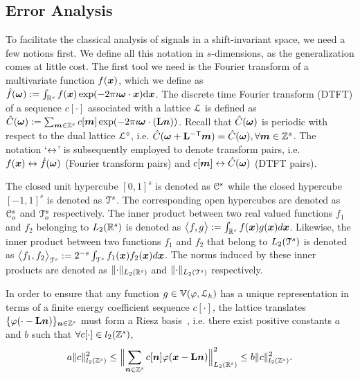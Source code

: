 \subsection{Error Analysis} \label{sec:sis_error}
To facilitate the classical analysis of signals in a shift-invariant space, we need a few notions first. We define all this notation in $s$-dimensions, as the generalization comes at little cost. The first tool we need is the Fourier transform of a multivariate function $f(\boldsymbol{x})$, which we define as $ \hat{f}(\boldsymbol{\omega}) := \int_{\mathbb{R}^s} f(\boldsymbol{x}) \exp(-2\pi \imath \boldsymbol{\omega} \cdot \boldsymbol{x}) \mathrm{d}\boldsymbol{x} $. The discrete time Fourier transform (DTFT) of a sequence $c[\cdot]$ associated with a lattice $\mathcal{L}$ is defined as $\hat{C}(\boldsymbol{\omega}) := \sum_{\boldsymbol{m}  \in \mathbb{Z}^s} c[\boldsymbol{m}] \exp(-2 \pi \imath \boldsymbol{\omega} \cdot (\mathbf{L}\boldsymbol{n}))$. Recall that $\hat{C}(\boldsymbol{\omega})$ is periodic with respect to the dual lattice $\mathcal{L}^{\circ}$, i.e. $\hat{C}(\boldsymbol{\omega} + {\mathbf{L}}^{\mathsf{-T}} \boldsymbol{m}) = \hat{C}(\boldsymbol{\omega}), \forall \boldsymbol{m} \in \mathbb{Z}^s$. The notation `$\leftrightarrow$' is subsequently employed to denote transform pairs, i.e. $f(\boldsymbol{x}) \leftrightarrow \hat{f}(\boldsymbol{\omega})$ (Fourier transform pairs) and $c[\boldsymbol{m}] \leftrightarrow \hat{C}(\boldsymbol{\omega})$ (DTFT pairs).

The closed unit hypercube $[0,1]^s$ is denoted as $\mathcal{C}^s$ while the closed hypercube $[-1,1]^s$ is denoted as $\mathcal{T}^s$. The corresponding open hypercubes are denoted as $\mathcal{C}_o^s$ and $\mathcal{T}_o^s$ respectively. The inner product between two real valued functions $f_1$ and $f_2$ belonging to $L_2(\mathbb{R}^s)$ is denoted as $\bigl \langle f , g \bigr \rangle := \int_{\mathbb{R}^s} f(\boldsymbol{x}) g(\boldsymbol{x}) d\boldsymbol{x}$. Likewise, the inner product between two functions $f_1$ and $f_2$ that belong to $L_2(\mathcal{T}^s)$ is denoted as $\bigl \langle f_1 , f_2 \bigr \rangle_{\mathcal{T}^s} := {2^{-s}} \int_{\mathcal{T}^s} f_1(\boldsymbol{x}) f_2(\boldsymbol{x}) d\boldsymbol{x}$. The norms induced by these inner products are denoted as $\lVert \cdot \rVert_{L_2(\mathbb{R}^s)}$ and $\lVert \cdot \rVert_{L_2(\mathcal{T}^s)}$ respectively.

In order to ensure that any function $g \in \mathbb{V}({\varphi},{\mathcal{L}_h})$ has a unique representation in terms of a finite energy coefficient sequence $c[\cdot]$, the lattice translates $\{\varphi(\cdot - \mathbf{L}\boldsymbol{n})\}_{\boldsymbol{n}  \in \mathbb{Z}^s}$ must form a Riesz basis~\cite{kreyszig89}, i.e. there exist positive constants $a$ and $b$ such that $\forall c[\cdot] \in l_2(\mathbb{Z}^s)$,
\begin{equation*}
  a \lVert c\rVert^2_{l_2(\mathbb{Z}^s)} \le \Bigl\lVert \sum_{\boldsymbol{n} \in \mathbb{Z}^s}
  c[\boldsymbol{n}] \varphi(\boldsymbol{x} - \mathbf{L}\boldsymbol{n}) \Bigr\rVert_{L_2(\mathbb{R}^s)}^2 \le b
	\lVert c\rVert^2_{l_2(\mathbb{Z}^s)}.
\end{equation*}


